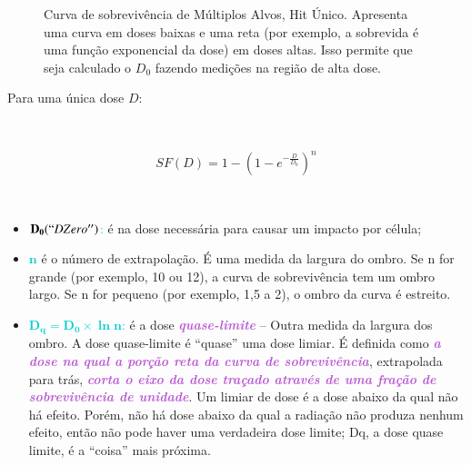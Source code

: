 \documentclass[11pt,a4paper]{article}
\newcounter{exemplo}
\begin{document}
	\begin{figure}[h]
		\centering
		\caption{Curva de sobrevivência de Múltiplos Alvos, Hit Único. Apresenta uma curva em doses baixas e uma reta (por exemplo, a sobrevida é uma função exponencial da dose) em doses altas. Isso permite que seja calculado o $D_0$ fazendo medições na região de alta dose.}
		\label{fig:singleHitMultiTarget}
	\end{figure}

	Para uma única dose $D$:

	\

	\begin{equation}
		SF(D) = 1 - \left(1 - e ^{- \frac{D}{D_0}}\right)^n
	\end{equation}

	\

	\begin{exemplo}[onde,]
		\begin{itemize}
			\item \textcolor{DarkTurquoise}{$\mathbf{D_0}(``D Zero'')$:} é na dose necessária para causar um impacto por célula;
			\item \textcolor{DarkTurquoise}{$\mathbf{n}$} é o número de extrapolação. É uma medida da largura do ombro. Se n for grande (por exemplo, 10 ou 12), a curva de sobrevivência tem um ombro largo. Se n for pequeno (por exemplo, 1,5 a 2), o ombro da curva é estreito. 
			\item \textcolor{DarkTurquoise}{$\mathbf{D_q = D_0 \times \ln n}$:} é a dose \textcolor{MediumOrchid}{\textbf{\textit{quase-limite}}} -- Outra medida da largura dos ombro. A dose quase-limite é ``quase'' uma dose limiar. É definida como \textcolor{MediumOrchid}{\textbf{\textit{a dose na qual a porção reta da curva de sobrevivência}}}, extrapolada para trás, \textcolor{MediumOrchid}{\textbf{\textit{corta o eixo da dose traçado através de uma fração de sobrevivência de unidade}}}. Um limiar de dose é a dose abaixo da qual não há efeito. Porém, não há dose abaixo da qual a radiação não produza nenhum efeito, então não pode haver uma verdadeira dose limite; Dq, a dose quase limite, é a ``coisa'' mais próxima.
		\end{itemize}
	\end{exemplo}
	
\end{document}
